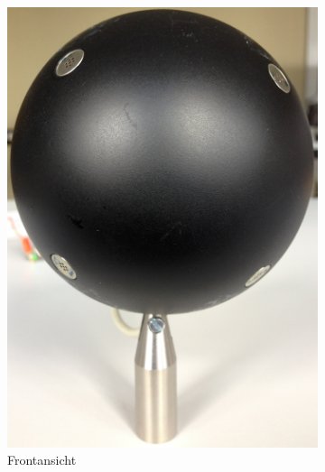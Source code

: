 \begin{figure}
        \centering
        \begin{subfigure}[b]{0.34\textwidth}
                \centering
                \includegraphics[width=\textwidth]{grafiken/02_Konzeptionierung/Foto_MikrofonArray_Frontansicht}
                \caption{Frontansicht}
                \label{fig:Foto_MikrofonArray_Frontansicht}
        \end{subfigure}
        ~ %
        \begin{subfigure}[b]{0.35\textwidth}
                \centering

\end{subfigure}
\end{figure}
